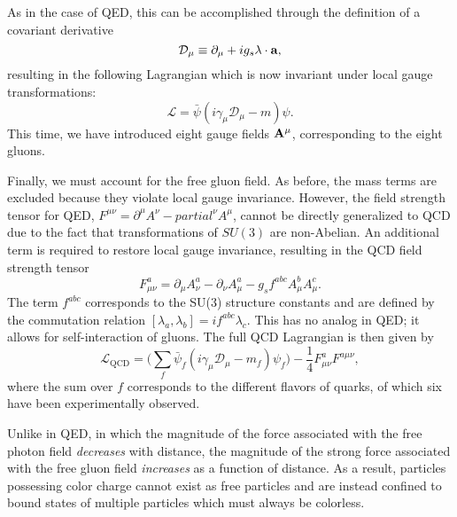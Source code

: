 As in the case of QED, this can be accomplished through the definition of a covariant derivative
\begin{equation}
    \mathcal D_\mu \equiv \partial_\mu + i g_s \bf{\lambda} \cdot \bf{a},
\end{equation}
resulting in the following Lagrangian which is now invariant under local gauge transformations:
\begin{equation}
    \mathcal L = \bar{\psi}(i \gamma_\mu \mathcal D_\mu - m) \psi.
\end{equation}
This time, we have introduced eight gauge fields $\bf{A}^\mu$, corresponding to the eight gluons.

Finally, we must account for the free gluon field.
As before, the mass terms are excluded because they violate local gauge invariance.
However, the field strength tensor for QED, $F^{\mu\nu} = \partial^\mu A^\nu - partial^\nu A^\mu$, cannot be directly generalized to QCD due to the fact that transformations of $SU(3)$ are non-Abelian.
An additional term is required to restore local gauge invariance, resulting in the QCD field strength tensor
\begin{equation}
    F_{\mu \nu}^a = \partial_\mu A_\nu^a - \partial_\nu A_\mu^a - g_s f^{abc} A_\mu^b A_\mu^c.
\end{equation}
The term $f^{abc}$ corresponds to the SU(3) structure constants and are defined by the commutation relation $[\lambda_a, \lambda_b] = i f^{abc} \lambda_c$.
This has no analog in QED; it allows for self-interaction of gluons.
The full QCD Lagrangian is then given by
\begin{equation} \label{eqn:qcd_lagrangian}
    \mathcal L_{\text{QCD}} = \bigg(\sum_f \bar{\psi}_f (i \gamma_\mu \mathcal D_\mu - m_f) \psi_f \bigg) - \frac{1}{4} F_{\mu \nu}^a F^{a \mu \nu},
\end{equation}
where the sum over $f$ corresponds to the different flavors of quarks, of which six have been experimentally observed.

Unlike in QED, in which the magnitude of the force associated with the free photon field \emph{decreases} with distance, the magnitude of the strong force associated with the free gluon field \emph{increases} as a function of distance.
As a result, particles possessing color charge cannot exist as free particles and are instead confined to bound states of multiple particles which must always be colorless.

